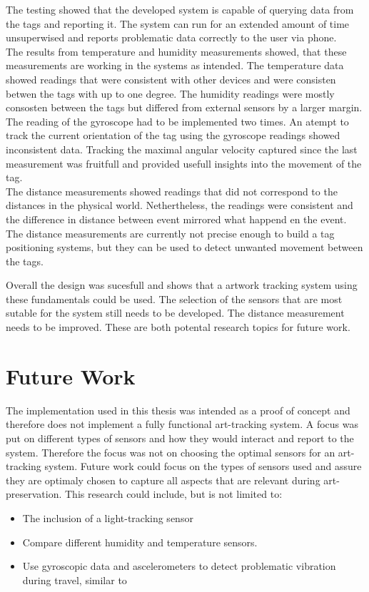 The testing showed that the developed system is capable of querying data from the tags and reporting it.
The system can run for an extended amount of time unsuperwised and reports problematic data correctly to the user via phone.\\
The results from temperature and humidity measurements showed, that these measurements are working in the systems as intended.
The temperature data showed readings that were consistent with other devices and were consisten betwen the tags with up to one degree.
The humidity readings were mostly consosten between the tags but differed from external sensors by a larger margin.\\
The reading of the gyroscope had to be implemented two times.
An atempt to track the current orientation of the tag using the gyroscope readings showed inconsistent data.
Tracking the maximal angular velocity captured since the last measurement was fruitfull and provided usefull insights into the movement of the tag.\\
The distance measurements showed readings that did not correspond to the distances in the physical world.
Nethertheless, the readings were consistent and the difference in distance between event mirrored what happend en the event.
The distance measurements are currently not precise enough to build a tag positioning systems, but they can be used to detect unwanted movement between the tags.


Overall the design was sucesfull and shows that a artwork tracking system using these fundamentals could be used.
The selection of the sensors that are most sutable for the system still needs to be developed.
The distance measurement needs to be improved.
These are both potental research topics for future work.

\section{Future Work}
\label{s:future_work}

The implementation used in this thesis was intended as a proof of concept and therefore does not implement a fully functional art-tracking system.
A focus was put on different types of sensors and how they would interact and report to the system.
Therefore the focus was not on choosing the optimal sensors for an art-tracking system.
Future work could focus on the types of sensors used and assure they are optimaly chosen to capture all aspects that are relevant during art-preservation.
This research could include, but is not limited to:
\begin{itemize}
	\item The inclusion of a light-tracking sensor
	\item Compare different humidity and temperature sensors.
	\item Use gyroscopic data and ascelerometers to detect problematic vibration during travel, similar to \cite{landi2022iot}
\end{itemize}


